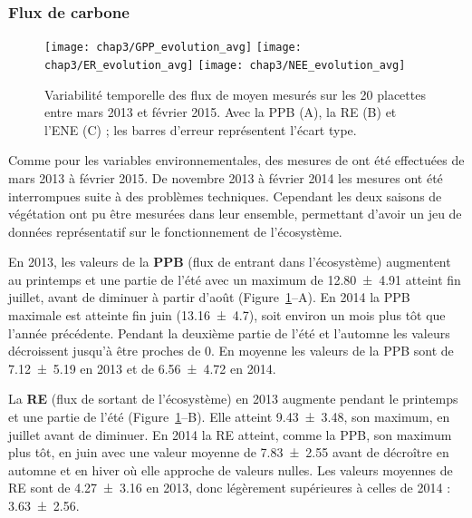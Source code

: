\subsubsection{Flux de carbone}

\begin{figure}
	\centering
	\texttt{[image: chap3/GPP\_evolution\_avg]}
	\texttt{[image: chap3/ER\_evolution\_avg]}
	\texttt{[image: chap3/NEE\_evolution\_avg]}
\caption{Variabilité temporelle des flux de \coo moyen mesurés sur les 20 placettes entre mars 2013 et février 2015. Avec la PPB (A), la RE (B) et l'ENE (C) ; les barres d'erreur représentent l'écart type.}
\label{fig:flux_evolution_avg}
\end{figure}

Comme pour les variables environnementales, des mesures de \coo ont été effectuées de mars 2013 à février 2015.
De novembre 2013 à février 2014 les mesures ont été interrompues suite à des problèmes techniques.
Cependant les deux saisons de végétation ont pu être mesurées dans leur ensemble, permettant d'avoir un jeu de données représentatif sur le fonctionnement de l'écosystème.

En 2013, les valeurs de la \textbf{PPB} (flux de \coo entrant dans l'écosystème) augmentent au printemps et une partie de l'été avec un maximum de \SI{12.80(491)}{\uml} atteint fin juillet, avant de diminuer à partir d'août (Figure~\ref{fig:flux_evolution_avg}--A).
En 2014 la PPB maximale est atteinte fin juin (\SI{13.16(470)}{\uml}), soit environ un mois plus tôt que l'année précédente.
Pendant la deuxième partie de l'été et l'automne les valeurs décroissent jusqu'à être proches de 0.
En moyenne les valeurs de la PPB sont de \SI{7.12(519)}{\uml} en 2013 et de \SI{6.56(472)}{\uml} en 2014.

La \textbf{RE} (flux de \coo sortant de l'écosystème) en 2013 augmente pendant le printemps et une partie de l'été (Figure~\ref{fig:flux_evolution_avg}--B).
Elle atteint \SI{9.43(348)}{\uml}, son maximum, en juillet avant de diminuer.
En 2014 la RE atteint, comme la PPB, son maximum plus tôt, en juin avec une valeur moyenne de \SI{7.83(255)}{\uml} avant de décroître en automne et en hiver où elle approche de valeurs nulles.
Les valeurs moyennes de RE sont de \SI{4.27(316)}{\uml} en 2013, donc légèrement supérieures à celles de 2014 : \SI{3.63(256)}{\uml}.

